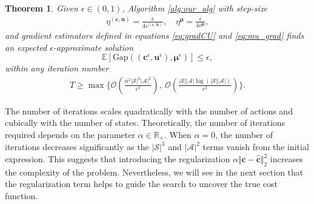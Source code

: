 \documentclass[10pt]{article} %
\newtheorem{theorem}{Theorem}
\def\Ac{\ensuremath{\mathcal{A}}}
\def\vc{{\bm{c}}}
\def\vu{{\bm{u}}}
\def\vmu{{\bm{\mu}}}
\newcommand{\E}{\mathbb{E}}
\newcommand{\R}{\mathbb{R}}
\newcommand{\St}{\mathcal{S}}
\begin{document}
\begin{theorem}\label{theorem:algconvergence}
    Given $\epsilon \in (0,1)$, Algorithm \ref{alg:our_alg} with step-size
    \begin{align*}
        \eta^{(\vc,\vu)} = \frac{\epsilon}{4v^{(\vc,\vu)}}, \quad \eta^{\vmu} = \frac{\epsilon}{4v^{\vmu}},
    \end{align*} 
    and gradient estimators defined in equations \eqref{eq:gradCU} and \eqref{eq:mu_grad} finds an expected $\epsilon$-approximate solution $$\E\left[\text{Gap}((\vc^\epsilon, \vu^\epsilon), \vmu^\epsilon)\right] \leq \epsilon,$$
    within any iteration number 
    \begin{align*}
        T\geq \max\Bigg\{\mathcal{O}\left(\frac{\alpha^2 |\St|^3|\Ac|^2}{\epsilon^2}\right),\: \mathcal{O}\left(\frac{|\St||\Ac|\log(|\St||\Ac|)}{\epsilon^2}\right)\Bigg\}.
    \end{align*}
\end{theorem}

The number of iterations scales quadratically with the number of actions and cubically with the number of states. Theoretically, the number of iterations required depends on the parameter $\alpha\in \R_+$. When $\alpha = 0$, the number of iterations decreases significantly as the $|\St|^3$ and $|\Ac|^2$ terms vanish from the initial expression. This suggests that introducing the regularization $\alpha \Vert \vc - \hat{\vc} \Vert^2_2$ increases the complexity of the problem. Nevertheless, we will see in the next section that the regularization term helps to guide the search to uncover the true cost function.
\end{document}
